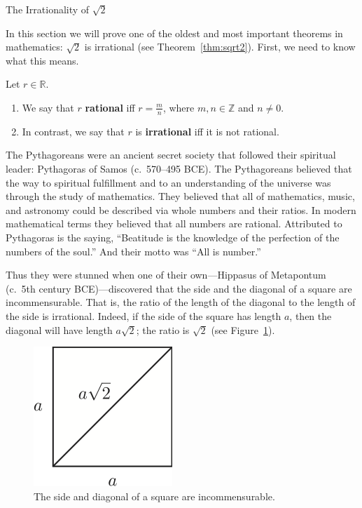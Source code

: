 \begin{section}{The Irrationality of $\sqrt{2}$}

In this section we will prove one of the oldest and most important theorems in mathematics: $\sqrt{2}$ is irrational (see Theorem~\ref{thm:sqrt2}). First, we need to know what this means.

\begin{definition}
Let $r\in\mathbb{R}$.
\begin{enumerate}[label=\textrm{(\alph*)}]
\item We say that $r$ \textbf{rational} iff $r=\frac{m}{n}$, where $m,n\in\mathbb{Z}$ and $n\neq 0$.  
\item In contrast, we say that $r$ is \textbf{irrational} iff it is not rational.
\end{enumerate} 
\end{definition}

The Pythagoreans were an ancient secret society that followed their spiritual leader: Pythagoras of Samos (c.\ 570--495 BCE). The Pythagoreans believed that the way to spiritual fulfillment and to an understanding of the universe was through the study of mathematics. They believed that all of mathematics, music, and astronomy could be described via whole numbers and their ratios. In modern mathematical terms they believed that all numbers are rational. Attributed to Pythagoras is the saying, ``Beatitude is the knowledge of the perfection of the numbers of the soul.'' And their motto was ``All is number.''

Thus they were stunned when one of their own---Hippasus of Metapontum (c.\ 5th century BCE)---discovered that the side and the diagonal of a square are incommensurable. That is, the ratio of the length of the diagonal to the length of the side is irrational. Indeed, if the side of the square has length $a$, then the diagonal will have length $a\sqrt{2}$; the ratio is $\sqrt{2}$ (see Figure~\ref{fig:square}).

\begin{figure}[ht]
\begin{center}
\includegraphics{square.png}
\end{center}
\vspace{-.5cm}
\caption{The side and diagonal of a square are incommensurable.}
\label{fig:square}
\end{figure}


\end{section}
